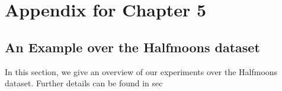 \graphicspath{{./chapters/chapter4/}}

\def\c{cr}
\def\hc{\hat{cr}}
\def\d{\Lambda}
\def\ind{\mathbbm{1}}
\def\oc{Online\_Cluster}
\def\mem{\mathcal M}
\def\E{\mathbb{E}}
\def\R{\mathbb{R}}
\def\O{\mathcal{O}}
\def\calP{\mathcal{P}}
\def\dc{Data\_Copy\_Detect}
\def\a{\kappa}
\def\hq{\widehat{q(B(x, r))}}
\def\alpaca{\epsilon}




\chapter{Appendix for Chapter 5}

\section{An Example over the Halfmoons dataset}\label{sec:app_experiments}

In this section, we give an overview of our experiments over the Halfmoons dataset. Further details can be found in sec


